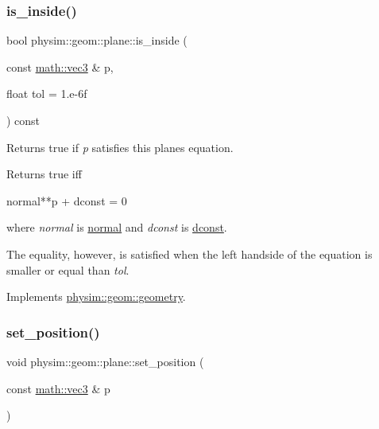 \mbox{\label{classphysim_1_1geom_1_1plane_a2a82c9b43f0883e0cfb7e49fe71b3434}} 
\subsubsection{\texorpdfstring{is\+\_\+inside()}{is\_inside()}}
{\footnotesize\ttfamily bool physim\+::geom\+::plane\+::is\+\_\+inside (\begin{DoxyParamCaption}\item[{const \hyperlink{structphysim_1_1math_1_1vec3}{math\+::vec3} \&}]{p,  }\item[{float}]{tol = {\ttfamily 1.e-\/6f} }\end{DoxyParamCaption}) const\hspace{0.3cm}{\ttfamily [virtual]}}



Returns true if {\itshape p} satisfies this plane\textquotesingle{}s equation. 

Returns true iff \begin{DoxyVerb}normal**p + dconst = 0
\end{DoxyVerb}
 where {\itshape normal} is \hyperlink{classphysim_1_1geom_1_1plane_ab9502f59c7c72083fe4ab166ad8e637a}{normal} and {\itshape dconst} is \hyperlink{classphysim_1_1geom_1_1plane_a80867844aac8461bd644cca6de9ef739}{dconst}.

The equality, however, is satisfied when the left handside of the equation is smaller or equal than {\itshape tol}. 

Implements \hyperlink{classphysim_1_1geom_1_1geometry_ab7aa1a32927e96ed384a93b84fbd62b7}{physim\+::geom\+::geometry}.

\mbox{\label{classphysim_1_1geom_1_1plane_a6922a19aee04c7a7a975c03a3601951f}} 
\subsubsection{\texorpdfstring{set\+\_\+position()}{set\_position()}}
{\footnotesize\ttfamily void physim\+::geom\+::plane\+::set\+\_\+position (\begin{DoxyParamCaption}\item[{const \hyperlink{structphysim_1_1math_1_1vec3}{math\+::vec3} \&}]{p }\end{DoxyParamCaption})\hspace{0.3cm}{\ttfamily [virtual]}}



